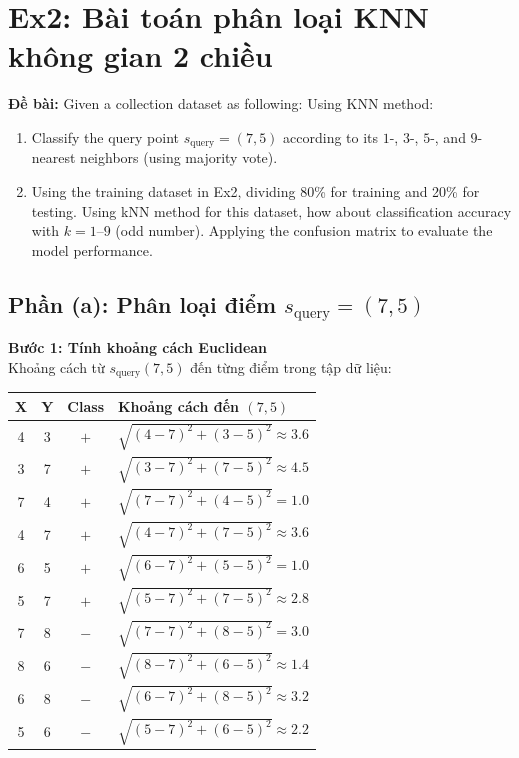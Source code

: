 \section{Ex2: Bài toán phân loại KNN không gian 2 chiều}

\textbf{Đề bài:} Given a collection dataset as following: Using KNN method:
\begin{enumerate}
    \item[(a)] Classify the query point $s_{\text{query}} = (7, 5)$ according to its $1$-, $3$-, $5$-, and $9$-nearest neighbors (using majority vote).
    \item[(b)] Using the training dataset in Ex2, dividing 80\% for training and 20\% for testing. Using kNN method for this dataset, how about classification accuracy with $k = 1\text{--}9$ (odd number). Applying the confusion matrix to evaluate the model performance.
\end{enumerate}

\subsection{Phần (a): Phân loại điểm $s_{\text{query}} = (7, 5)$}

\textbf{Bước 1: Tính khoảng cách Euclidean} \\
Khoảng cách từ $s_{\text{query}}(7, 5)$ đến từng điểm trong tập dữ liệu:

\begin{table}[H]
    \centering
    \begin{tabular}{|c|c|c|l|}
        \hline
        \textbf{X} & \textbf{Y} & \textbf{Class} & \textbf{Khoảng cách đến $(7, 5)$} \\
        \hline
        4 & 3 & $+$ & $\sqrt{(4-7)^2 + (3-5)^2} \approx 3.6$ \\ \hline
        3 & 7 & $+$ & $\sqrt{(3-7)^2 + (7-5)^2} \approx 4.5$ \\ \hline
        7 & 4 & $+$ & $\sqrt{(7-7)^2 + (4-5)^2} = 1.0$ \\ \hline
        4 & 7 & $+$ & $\sqrt{(4-7)^2 + (7-5)^2} \approx 3.6$ \\ \hline
        6 & 5 & $+$ & $\sqrt{(6-7)^2 + (5-5)^2} = 1.0$ \\ \hline
        5 & 7 & $+$ & $\sqrt{(5-7)^2 + (7-5)^2} \approx 2.8$ \\ \hline
        7 & 8 & $-$ & $\sqrt{(7-7)^2 + (8-5)^2} = 3.0$ \\ \hline
        8 & 6 & $-$ & $\sqrt{(8-7)^2 + (6-5)^2} \approx 1.4$ \\ \hline
        6 & 8 & $-$ & $\sqrt{(6-7)^2 + (8-5)^2} \approx 3.2$ \\ \hline
        5 & 6 & $-$ & $\sqrt{(5-7)^2 + (6-5)^2} \approx 2.2$ \\ \hline
    \end{tabular}
\end{table}

